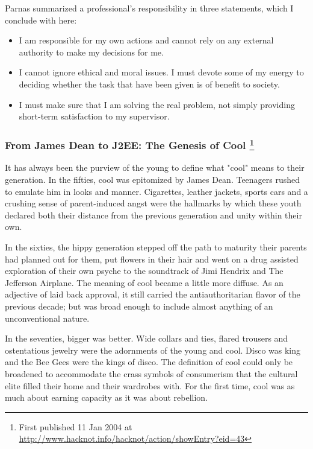 \documentclass{article}
\begin{document}
\begin{enumerate}
Parnas summarized a professional's responsibility in three statements,
which I conclude with here:

\begin{itemize}
\item I am responsible for my own actions and cannot rely on any external
authority to make my decisions for me.\\
\item I cannot ignore ethical and moral issues. I must devote some of my
energy to deciding whether the task that have been given is of
benefit to society.\\
\item I must make sure that I am solving the real problem, not simply
providing short-term satisfaction to my supervisor.
\end{itemize}
\end{enumerate}

\subsubsection{From James Dean to J2EE: The Genesis of Cool \footnote{First published 11 Jan 2004 at
\url{http://www.hacknot.info/hacknot/action/showEntry?eid=43}}}
\label{sec:orgheadline410}

It has always been the purview of the young to define what "cool" means
to their generation. In the fifties, cool was epitomized by James Dean.
Teenagers rushed to emulate him in looks and manner. Cigarettes, leather
jackets, sports cars and a crushing sense of parent-induced angst were
the hallmarks by which these youth declared both their distance from the
previous generation and unity within their own.

In the sixties, the hippy generation stepped off the path to maturity
their parents had planned out for them, put flowers in their hair and
went on a drug assisted exploration of their own psyche to the
soundtrack of Jimi Hendrix and The Jefferson Airplane. The meaning of
cool became a little more diffuse. As an adjective of laid back
approval, it still carried the antiauthoritarian flavor of the previous
decade; but was broad enough to include almost anything of an
unconventional nature.

In the seventies, bigger was better. Wide collars and ties, flared
trousers and ostentatious jewelry were the adornments of the young and
cool. Disco was king and the Bee Gees were the kings of disco. The
definition of cool could only be broadened to accommodate the crass
symbols of consumerism that the cultural elite filled their home and
their wardrobes with. For the first time, cool was as much about earning
capacity as it was about rebellion.
\end{document}
